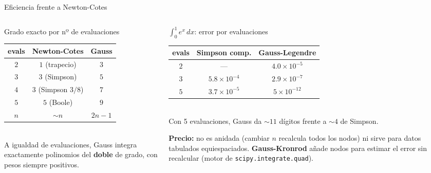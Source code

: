\documentclass[aspectratio=169,10pt]{beamer}
\begin{document}
\begin{frame}{Eficiencia frente a Newton-Cotes}
\begin{columns}[T]
\begin{column}{0.47\textwidth}
\begin{cardgear}{Grado exacto por nº de evaluaciones}{\faTable}
\centering
{\footnotesize\renewcommand{\arraystretch}{1.34}\setlength{\tabcolsep}{6pt}
\begin{tabular}{c|c|c}
evals & Newton-Cotes & Gauss\\\hline
$2$ & $1$ (trapecio) & $3$\\
$3$ & $3$ (Simpson) & $5$\\
$4$ & $3$ (Simpson $3/8$) & $7$\\
$5$ & $5$ (Boole) & $9$\\
$n$ & $\sim n$ & $2n-1$\\
\end{tabular}}\\[1.2mm]
{\footnotesize A igualdad de evaluaciones, Gauss integra exactamente polinomios del \textbf{doble} de grado, con pesos siempre positivos.}
\end{cardgear}
\end{column}
\begin{column}{0.51\textwidth}
\begin{cardgear}{$\int_0^1 e^x\,dx$: error por evaluaciones}{\faTable}
\centering
{\footnotesize\renewcommand{\arraystretch}{1.3}\setlength{\tabcolsep}{8pt}
\begin{tabular}{c|c|c}
evals & Simpson comp. & Gauss-Legendre\\\hline
$2$ & — & $4.0{\times}10^{-5}$\\
$3$ & $5.8{\times}10^{-4}$ & $2.9{\times}10^{-7}$\\
$5$ & $3.7{\times}10^{-5}$ & $5{\times}10^{-12}$\\
\end{tabular}}\\[1.0mm]
{\footnotesize Con 5 evaluaciones, Gauss da $\sim11$ dígitos frente a $\sim4$ de Simpson.}
\end{cardgear}
\vspace{1mm}
\begin{cardnota}[\faExclamationTriangle]
{\footnotesize \textbf{Precio:} no es anidada (cambiar $n$ recalcula todos los nodos) ni sirve para datos tabulados equiespaciados. \textbf{Gauss-Kronrod} añade nodos para estimar el error sin recalcular (motor de \texttt{scipy.integrate.quad}).}
\end{cardnota}
\end{column}
\end{columns}
\end{frame}
\end{document}
